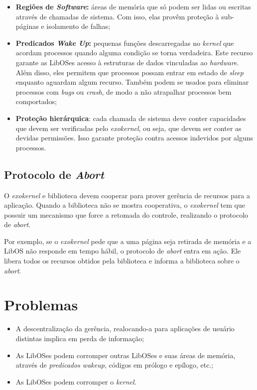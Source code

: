 \begin{itemize}
  \item \textbf{Regiões de \textit{Software}:} áreas de memória que só podem ser lidas ou escritas através de chamadas de sistema. Com isso, elas provêm proteção à sub-páginas e isolamento de falhas;

  \item \textbf{Predicados \textit{Wake Up}:} pequenas funções descarregadas no \textit{kernel} que acordam processos quando alguma condição se torna verdadeira. Este recurso garante as LibOSes acesso à estruturas de dados vinculadas ao \textit{hardware}. Além disso, eles permitem que processos possam entrar em estado de \textit{sleep} enquanto aguardam algum recurso. Também podem se usados para eliminar processos com \textit{bugs} ou \textit{crash}, de modo a não atrapalhar processos bem comportados;

  \item \textbf{Proteção hierárquica}: cada chamada de sistema deve conter capacidades que devem ser verificadas pelo \textit{exokernel}, ou seja, que devem ser conter as devidas permissões. Isso garante proteção contra acessos indevidos por alguns processos.
\end{itemize}

\subsection{Protocolo de \textit{Abort}}
O \textit{exokernel} e biblioteca devem cooperar para prover gerência de recursos para a aplicação. Quando a biblioteca não se mostra cooperativa, o \textit{exokernel} tem que possuir um mecanismo que force a retomada do controle, realizando o protocolo de \textit{abort}.

Por exemplo, se o \textit{exokernel} pede que a uma página seja retirada de memória e a LibOS não responde em tempo hábil, o protocolo de \textit{abort} entra em ação. Ele libera todos os recursos obtidos pela biblioteca e informa a biblioteca sobre o \textit{abort}.

\section{Problemas}
\begin{itemize}
  \item A descentralização da gerência, realocando-a para aplicações de usuário distintas implica em perda de informação;

  \item As LibOSes podem corromper outras LibOSes e suas áreas de memória, através de \textit{predicados wakeup}, códigos em prólogo e epílogo, etc.;

  \item As LibOSes podem corromper o \textit{kernel}.
\end{itemize}
